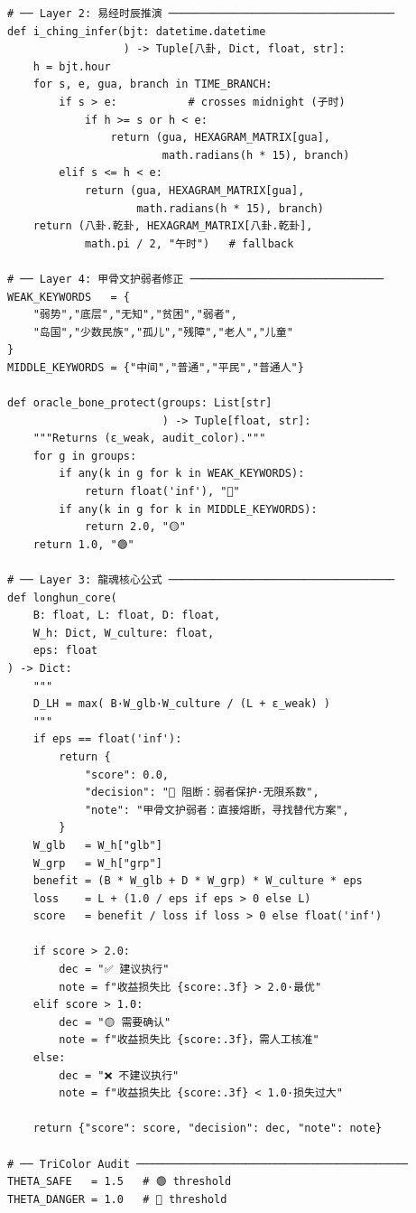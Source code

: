 \documentclass[conference]{IEEEtran}
\begin{document}
\begin{lstlisting}[style=python,
  caption={LongHun Dynamic Weight Algorithm — Python v2.0},
  label={lst:python}]
# ── Layer 2: 易经时辰推演 ───────────────────────────────────
def i_ching_infer(bjt: datetime.datetime
                  ) -> Tuple[八卦, Dict, float, str]:
    h = bjt.hour
    for s, e, gua, branch in TIME_BRANCH:
        if s > e:           # crosses midnight (子时)
            if h >= s or h < e:
                return (gua, HEXAGRAM_MATRIX[gua],
                        math.radians(h * 15), branch)
        elif s <= h < e:
            return (gua, HEXAGRAM_MATRIX[gua],
                    math.radians(h * 15), branch)
    return (八卦.乾卦, HEXAGRAM_MATRIX[八卦.乾卦],
            math.pi / 2, "午时")   # fallback

# ── Layer 4: 甲骨文护弱者修正 ──────────────────────────────
WEAK_KEYWORDS   = {
    "弱势","底层","无知","贫困","弱者",
    "岛国","少数民族","孤儿","残障","老人","儿童"
}
MIDDLE_KEYWORDS = {"中间","普通","平民","普通人"}

def oracle_bone_protect(groups: List[str]
                        ) -> Tuple[float, str]:
    """Returns (ε_weak, audit_color)."""
    for g in groups:
        if any(k in g for k in WEAK_KEYWORDS):
            return float('inf'), "🔴"
        if any(k in g for k in MIDDLE_KEYWORDS):
            return 2.0, "🟡"
    return 1.0, "🟢"

# ── Layer 3: 龍魂核心公式 ───────────────────────────────────
def longhun_core(
    B: float, L: float, D: float,
    W_h: Dict, W_culture: float,
    eps: float
) -> Dict:
    """
    D_LH = max( B·W_glb·W_culture / (L + ε_weak) )
    """
    if eps == float('inf'):
        return {
            "score": 0.0,
            "decision": "🔴 阻断：弱者保护·无限系数",
            "note": "甲骨文护弱者：直接熔断，寻找替代方案",
        }
    W_glb   = W_h["glb"]
    W_grp   = W_h["grp"]
    benefit = (B * W_glb + D * W_grp) * W_culture * eps
    loss    = L + (1.0 / eps if eps > 0 else L)
    score   = benefit / loss if loss > 0 else float('inf')

    if score > 2.0:
        dec = "✅ 建议执行"
        note = f"收益损失比 {score:.3f} > 2.0·最优"
    elif score > 1.0:
        dec = "🟡 需要确认"
        note = f"收益损失比 {score:.3f}，需人工核准"
    else:
        dec = "❌ 不建议执行"
        note = f"收益损失比 {score:.3f} < 1.0·损失过大"

    return {"score": score, "decision": dec, "note": note}

# ── TriColor Audit ──────────────────────────────────────────
THETA_SAFE   = 1.5   # 🟢 threshold
THETA_DANGER = 1.0   # 🔴 threshold


\end{lstlisting}
\end{document}
